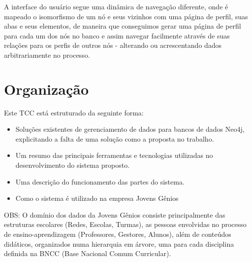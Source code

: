 A interface do usuário segue uma dinâmica de navegação diferente, onde é mapeado o isomorfismo de um nó e seus vizinhos com uma página de perfil, suas abas e seus elementos, de maneira que conseguimos gerar uma página de perfil para cada um dos nós no banco e assim navegar facilmente através de suas relações para os perfis de outros nós - alterando ou acrescentando dados arbitrariamente no processo.

\section{Organização}

Este TCC está estruturado da seguinte forma:
\begin{itemize}
  \item Soluções existentes de gerenciamento de dados para bancos de dados Neo4j, explicitando a falta de uma solução como a proposta no trabalho.
  \item Um resumo das principais ferramentas e tecnologias utilizadas no desenvolvimento do sistema proposto.
  \item Uma descrição do funcionamento das partes do sistema.
  \item Como o sistema é utilizado na empresa Jovens Gênios
\end{itemize}

OBS: O domínio dos dados da Jovens Gênios consiste principalmente das estruturas escolares (Redes, Escolas, Turmas), as pessoas envolvidas no processo de ensino-aprendizagem (Professores, Gestores, Alunos), além de conteúdos didáticos, organizados numa hierarquia em árvore, uma para cada disciplina definida na BNCC (Base Nacional Comum Curricular).
